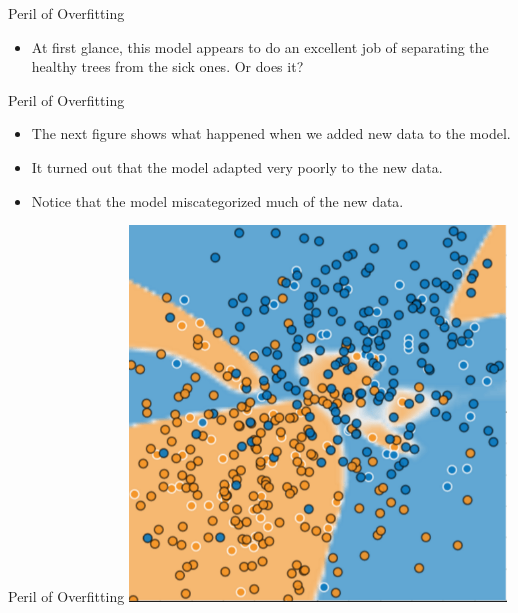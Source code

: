 \documentclass{beamer}
\begin{document}

\begin{frame}{Peril of Overfitting}
\begin{itemize}
\item At first glance, this model appears to do an excellent job of separating the healthy trees from the sick ones. Or does it?
\end{itemize}
\end{frame}


\begin{frame}{Peril of Overfitting}
\begin{itemize}
\item The next figure shows what happened when we added new data to the model. 

\medskip
\item It turned out that the model adapted very poorly to the new data. 

\medskip
\item Notice that the model miscategorized much of the new data.
\end{itemize}
\end{frame}


\begin{frame}{Peril of Overfitting}
\includegraphics[width=0.75\textwidth]{images/GeneralizationC.png}
\end{frame}

\end{document}
